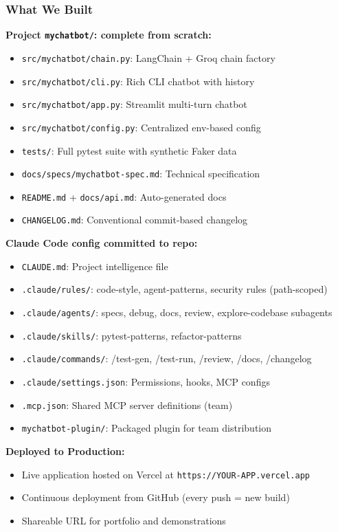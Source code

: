 \begin{frame}[fragile]\frametitle{What We Built}
\textbf{Project \texttt{mychatbot/}: complete from scratch:}
  \begin{itemize}
    \item \texttt{src/mychatbot/chain.py}: LangChain + Groq chain factory
    \item \texttt{src/mychatbot/cli.py}: Rich CLI chatbot with history
    \item \texttt{src/mychatbot/app.py}: Streamlit multi-turn chatbot
    \item \texttt{src/mychatbot/config.py}: Centralized env-based config
    \item \texttt{tests/}: Full pytest suite with synthetic Faker data
    \item \texttt{docs/specs/mychatbot-spec.md}: Technical specification
    \item \texttt{README.md} + \texttt{docs/api.md}: Auto-generated docs
    \item \texttt{CHANGELOG.md}: Conventional commit-based changelog
  \end{itemize}

\textbf{Claude Code config committed to repo:}
  \begin{itemize}
    \item \texttt{CLAUDE.md}: Project intelligence file
    \item \texttt{.claude/rules/}: code-style, agent-patterns, security rules (path-scoped)
    \item \texttt{.claude/agents/}: specs, debug, docs, review, explore-codebase subagents
    \item \texttt{.claude/skills/}: pytest-patterns, refactor-patterns
    \item \texttt{.claude/commands/}: /test-gen, /test-run, /review, /docs, /changelog
    \item \texttt{.claude/settings.json}: Permissions, hooks, MCP configs
    \item \texttt{.mcp.json}: Shared MCP server definitions (team)
    \item \texttt{mychatbot-plugin/}: Packaged plugin for team distribution
  \end{itemize}

\textbf{Deployed to Production:}
  \begin{itemize}
    \item Live application hosted on Vercel at \texttt{https://YOUR-APP.vercel.app}
    \item Continuous deployment from GitHub (every push = new build)
    \item Shareable URL for portfolio and demonstrations
  \end{itemize}
\end{frame}


